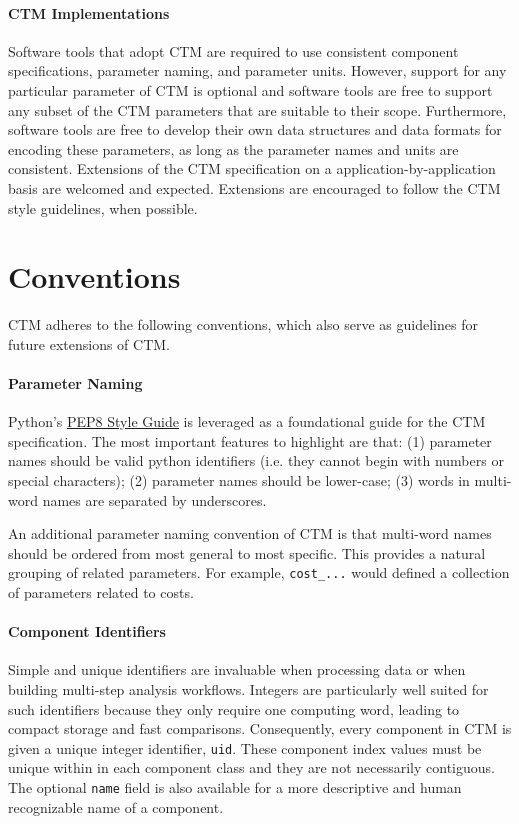 \documentclass{article}
\begin{document}
\paragraph{CTM Implementations}
%
Software tools that adopt CTM are required to use consistent component specifications, parameter naming, and parameter units.  However, support for any particular parameter of CTM is optional and software tools are free to support any subset of the CTM parameters that are suitable to their scope.  Furthermore, software tools are free to develop their own data structures and data formats for encoding these parameters, as long as the parameter names and units are consistent.  Extensions of the CTM specification on a application-by-application basis are welcomed and expected.  Extensions are encouraged to follow the CTM style guidelines, when possible.



\section{Conventions}

CTM adheres to the following conventions, which also serve as guidelines for future extensions of CTM.

\paragraph{Parameter Naming}
%
Python's \href{https://www.python.org/dev/peps/pep-0008/}{PEP8 Style Guide} is leveraged as a foundational guide for the CTM specification.  The most important features to highlight are that: (1) parameter names should be valid python identifiers (i.e. they cannot begin with numbers or special characters); (2) parameter names should be lower-case; (3) words in multi-word names are separated by underscores.

An additional parameter naming convention of CTM is that multi-word names should be ordered from most general to most specific.  This provides a natural grouping of related parameters.  For example, \texttt{cost\_...} would defined a collection of parameters related to costs.


\paragraph{Component Identifiers}
%
Simple and unique identifiers are invaluable when processing data or when building multi-step analysis workflows.  Integers are particularly well suited for such identifiers because they only require one computing word, leading to compact storage and fast comparisons.  Consequently, every component in CTM is given a unique integer identifier, \texttt{uid}.  These component index values must be unique within in each component class and they are not necessarily contiguous.  The optional \texttt{name} field is also available for a more descriptive and human recognizable name of a component.
\end{document}
